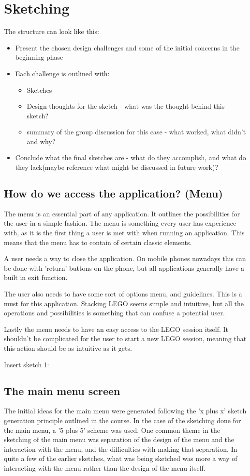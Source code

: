 \section{Sketching}
The structure can look like this:
\begin{itemize}
	\item Present the chosen design challenges and some of the initial concerns in the beginning phase
	\item Each challenge is outlined with:
		\begin{itemize}
			\item Sketches
			\item Design thoughts for the sketch - what was the thought behind this sketch?
			\item summary of the group discussion for this case - what worked, what didn't and why?
		\end{itemize}
	\item Conclude what the final sketches are - what do they accomplish, and what do they lack(maybe reference what might be discussed in future work)?
\end{itemize}
\subsection{How do we access the application? (Menu)}
The menu is an essential part of any application. It outlines the possibilities for the user in a simple fashion. The menu is something every user has experience with, as it is the first thing a user is met with when running an application. This means that the menu has to contain of certain classic elements.\par A user needs a way to close the application. On mobile phones nowadays this can be done with 'return' buttons on the phone, but all applications generally have a built in exit function.\par
The user also needs to have some sort of options menu, and guidelines. This is a must for this application. Stacking LEGO seems simple and intuitive, but all the operations and possibilities is something that can confuse a potential user. \par
Lastly the menu needs to have an easy access to the LEGO session itself. It shouldn't be complicated for the user to start a new LEGO session, meaning that this action should be as intuitive as it gets.\par
\begin{center}
	Insert sketch 1:
\end{center}

\subsection{The main menu screen}
The initial ideas for the main menu were generated following the 'x plus x' sketch generation principle outlined in the course. In the case of the sketching done for the main menu, a '5 plus 5' scheme was used. One common theme in the sketching of the main menu was separation of the design of the menu and the interaction with the menu, and the difficulties with making that separation. In quite a few of the earlier sketches, what was being sketched was more a way of interacting with the menu rather than the design of the menu itself.
